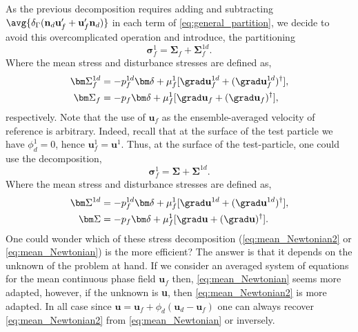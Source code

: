 As the previous decomposition requires adding and subtracting $\avg{\delta_\Gamma (\textbf{n}_d \textbf{u}_f'+  \textbf{u}_f' \textbf{n}_d)}$ in each term of \ref{eq:general_partition}, we decide to avoid this overcomplicated operation and introduce, the partitioning 
\begin{equation}
    \bm\sigma_f^1 =
    \bm\Sigma_f + 
    \bm\Sigma_f^{1d}. 
    \label{eq:mean_Newtonian}
\end{equation}
Where the mean stress and disturbance stresses are defined as, 
\begin{align}
    \bm\Sigma_f^{1d}
    &=-p_f^{1d}\bm\delta + \mu_f^1 [\grad \textbf{u}^{1d}_f + (\grad \textbf{u}^{1d}_f)^\dagger], \\
    \bm\Sigma_f
    &=-p_f\bm\delta + \mu_f^1 [\grad \textbf{u}_f + (\grad \textbf{u}_f)^\dagger], 
\end{align}
respectively. 
Note that the use of $\textbf{u}_f$ as the ensemble-averaged velocity of reference is arbitrary.
Indeed, recall that at the surface of the test particle we have $\phi_d^1=0$, hence $\textbf{u}_f^1 = \textbf{u}^1$. 
Thus, at the surface of the test-particle, one could use the decomposition,
\begin{equation}
    \bm\sigma_f^1 =
    \bm\Sigma + 
    \bm\Sigma^{1d}. 
    \label{eq:mean_Newtonian2}
\end{equation}
Where the mean stress and disturbance stresses are defined as, 
\begin{align}
    \bm\Sigma^{1d}
    &=-p_f^{1d}\bm\delta + \mu_f^1 [\grad \textbf{u}^{1d} + (\grad \textbf{u}^{1d})^\dagger], \\
    \bm\Sigma
    &=-p_f\bm\delta + \mu_f^1 [\grad \textbf{u} + (\grad \textbf{u})^\dagger]. 
\end{align}
One could wonder which of these stress decomposition (\ref{eq:mean_Newtonian2} or \ref{eq:mean_Newtonian}) is the more efficient? 
The answer is that it depends on the unknown of the problem at hand. 
If we consider an averaged system of equations for the mean continuous phase field $\textbf{u}_f$ then, \ref{eq:mean_Newtonian} seems more adapted, however, if the unknown is \textbf{u}, then \ref{eq:mean_Newtonian2} is more adapted. 
In all case since $\textbf{u} = \textbf{u}_f + \phi_d (\textbf{u}_d - \textbf{u}_f)$ one can always recover \ref{eq:mean_Newtonian2} from \ref{eq:mean_Newtonian} or inversely.




